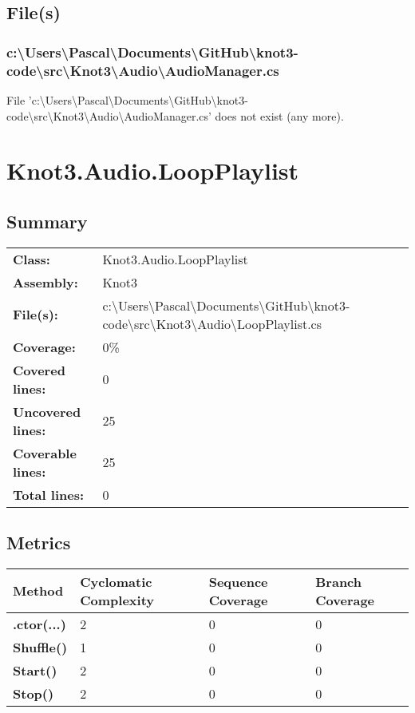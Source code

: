 \documentclass[a4paper,10pt]{article}
\begin{document}
\subsection{File(s)}
\subsubsection{c:\textbackslash Users\textbackslash Pascal\textbackslash Documents\textbackslash GitHub\textbackslash knot3-code\textbackslash src\textbackslash Knot3\textbackslash Audio\textbackslash AudioManager.cs}
 File 'c:\textbackslash Users\textbackslash Pascal\textbackslash Documents\textbackslash GitHub\textbackslash knot3-code\textbackslash src\textbackslash Knot3\textbackslash Audio\textbackslash AudioManager.cs' does not exist (any more).
\newpage
\section{Knot3.Audio.LoopPlaylist}
\subsection{Summary}
\begin{longtable}[l]{ll}
\textbf{Class:} & Knot3.Audio.LoopPlaylist\\
\textbf{Assembly:} & Knot3\\
\textbf{File(s):} & \begin{minipage}[t]{12cm}{c:\textbackslash Users\textbackslash Pascal\textbackslash Documents\textbackslash GitHub\textbackslash knot3-code\textbackslash src\textbackslash Knot3\textbackslash Audio\textbackslash LoopPlaylist.cs}\end{minipage} \\
\textbf{Coverage:} & 0\%\\
\textbf{Covered lines:} & 0\\
\textbf{Uncovered lines:} & 25\\
\textbf{Coverable lines:} & 25\\
\textbf{Total lines:} & 0\\
\end{longtable}
\subsection{Metrics}
\begin{longtable}[l]{|l|l|l|l|}
\hline
\textbf{Method} & \textbf{Cyclomatic Complexity} & \textbf{Sequence Coverage} & \textbf{Branch Coverage}\\
\hline
\textbf{.ctor(...)} & 2 & 0 & 0\\
\hline
\textbf{Shuffle()} & 1 & 0 & 0\\
\hline
\textbf{Start()} & 2 & 0 & 0\\
\hline
\textbf{Stop()} & 2 & 0 & 0\\
\hline
\end{longtable}
\end{document}
